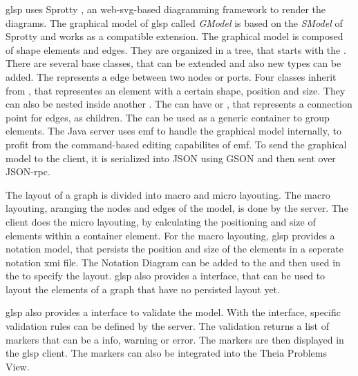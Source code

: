   \ac{glsp} uses Sprotty \cite{sprotty-repo}, an web-\acs{svg}-based diagramming framework to render the diagrams. The graphical model of \ac{glsp} called \textit{GModel} is based on the \textit{SModel} of Sprotty and works as a compatible extension. The graphical model is composed of shape elements and edges. They are organized in a tree, that starts with the . There are several base classes, that can be extended and also new types can be added. The  represents a edge between two nodes or ports. Four classes inherit from , that representes an element with a certain shape, position and size. They can also be nested inside another . The  can have  or , that represents a connection point for edges, as children. The  can be used as a generic container to group elements. The Java server uses \ac{emf} to handle the graphical model internally, to profit from the command-based editing capabilites of \ac{emf}. To send the graphical model to the client, it is serialized into JSON using GSON \cite{gson-repo} and then sent over JSON-\acs{rpc}. \cite{glsp-doc}

  The layout of a graph is divided into macro and micro layouting.
  The macro layouting, aranging the nodes and edges of the model, is done by the server. The client does the micro layouting, by calculating the positioning and size of elements within a container element. \cite{glsp-doc} For the macro layouting, \ac{glsp} provides a notation model, that persists the position and size of the elements in a seperate notation \ac{xmi} file. The Notation Diagram can be added to the  and then used in the  to specify the layout. \cite{glsp-repo} \ac{glsp} also provides a  interface, that can be used to layout the elements of a graph that have no persisted layout yet. \cite{glsp-doc}

  \ac{glsp} also provides a interface to validate the model. With the  interface, specific validation rules can be defined by the server. The validation returns a list of markers that can be a info, warning or error. The markers are then displayed in the \ac{glsp} client. The markers can also be integrated into the Theia Problems View.
